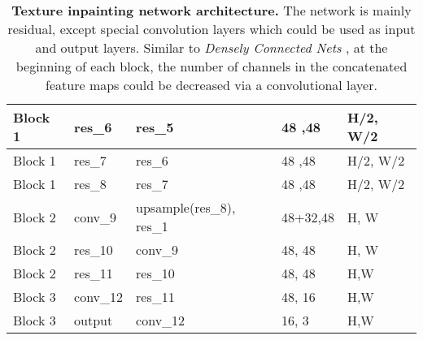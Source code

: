 \documentclass[runningheads]{llncs}
\newcommand{\squeezeup}{\vspace{-5.5mm}}
\begin{document}
\begin{table}[htb!]
\begin{tabular}{|l|l|l|l|l|}
Block 1                              & res\_6         & res\_5                           & 48 ,48                                                                 & H/2, W/2             \\ \hline
Block 1                              & res\_7         & res\_6                           & 48 ,48                                                                 & H/2, W/2             \\ \hline
Block 1                              & res\_8         & res\_7                           & 48 ,48                                                                 & H/2, W/2             \\ \hhline{|=|=|=|=|=|}
Block 2                              & conv\_9        & upsample(res\_8),  res\_1        & 48+32,48                                                               & H, W                 \\ \hline
Block 2                              & res\_10        & conv\_9                          & 48, 48                                                                 & H, W                 \\ \hhline{|=|=|=|=|=|}
Block 2                              & res\_11        & res\_10                          & 48, 48                                                                 & H,W                  \\ \hline
Block 3                              & conv\_12       & res\_11                          & 48, 16                                                                 & H,W                  \\ \hline
Block 3                              & output         & conv\_12                         & 16, 3                                                                  & H,W                  \\ \hline
\end{tabular}


\caption{\textbf{Texture inpainting network architecture.} The network is mainly residual, except special convolution layers which could be used as input and output layers. Similar to \textit{Densely Connected Nets} \cite{huang2017densely}, at the beginning of each block, the number of channels in the concatenated feature maps could be decreased via a convolutional layer.}
\label{tabel:texture_network}
\end{table}
\squeezeup
\end{document}
